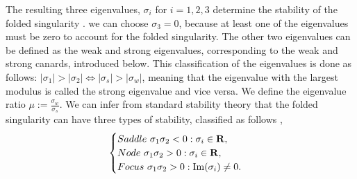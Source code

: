 The resulting three eigenvalues, $ \sigma_i $ for $ i=1,2,3 $ determine the stability of the folded singularity \citep{MMO}. \Wlg we can choose $ \sigma_3=0 $, because at least one of the eigenvalues must be zero to account for the folded singularity.
The other two eigenvalues can be defined as the weak and strong eigenvalues, corresponding to the weak and strong canards, introduced below. This classification of the eigenvalues is done as follows: $ |\sigma_1|>|\sigma_2| \iff |\sigma_s|>|\sigma_w| $, meaning that the eigenvalue with the largest modulus is called the strong eigenvalue and vice versa. %
We define the eigenvalue ratio $\mu:= \frac{\sigma_w}{\sigma_s}$. We can infer from standard stability theory that the folded singularity can have three types of stability, classified as follows \citep{MMO},
\begin{equation}
\begin{cases}
Saddle \ \sigma_1\sigma_2<0: \sigma_i\in\mathbf{R},\\
Node \ \sigma_1\sigma_2>0: \sigma_i\in\mathbf{R},\\
Focus \ \sigma_1\sigma_2>0: \mathrm{Im}(\sigma_i)\neq 0.
\end{cases}
\end{equation}

